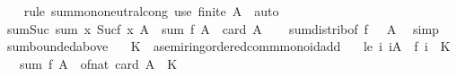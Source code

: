 \begin{isabellebody}
\ \ %
\endisadelimproof
%
\isatagproof
{}\isamarkupfalse%
\ {\isacharparenleft}{\kern0pt}rule\ sum{\isachardot}{\kern0pt}mono{\isacharunderscore}{\kern0pt}neutral{\isacharunderscore}{\kern0pt}cong{\isacharparenright}{\kern0pt}\ {\isacharparenleft}{\kern0pt}use\ {\isacartoucheopen}finite\ A{\isacartoucheclose}\ \ auto{\isacharparenright}{\kern0pt}%
\endisatagproof
{\isafoldproof}%
%
\isadelimproof
\isanewline
%
\endisadelimproof
\isanewline
{}\isamarkupfalse%
\isanewline
\isanewline
{}\isamarkupfalse%
\isanewline
\isanewline
{}\isamarkupfalse%
\ sum{\isacharunderscore}{\kern0pt}Suc{\isacharcolon}{\kern0pt}\ {\isachardoublequoteopen}sum\ {\isacharparenleft}{\kern0pt}{\isasymlambda}x{\isachardot}{\kern0pt}\ Suc{\isacharparenleft}{\kern0pt}f\ x{\isacharparenright}{\kern0pt}{\isacharparenright}{\kern0pt}\ A\ {\isacharequal}{\kern0pt}\ sum\ f\ A\ {\isacharplus}{\kern0pt}\ card\ A{\isachardoublequoteclose}\isanewline
%
\isadelimproof
\ \ %
\endisadelimproof
%
\isatagproof
{}\isamarkupfalse%
\ sum{\isachardot}{\kern0pt}distrib{\isacharbrackleft}{\kern0pt}of\ f\ {\isachardoublequoteopen}{\isasymlambda}{\isacharunderscore}{\kern0pt}{\isachardot}{\kern0pt}\ {}{\isachardoublequoteclose}\ A{\isacharbrackright}{\kern0pt}\ \isamarkupfalse%
\ simp%
\endisatagproof
{\isafoldproof}%
%
\isadelimproof
\isanewline
%
\endisadelimproof
\isanewline
{}\isamarkupfalse%
\ sum{\isacharunderscore}{\kern0pt}bounded{\isacharunderscore}{\kern0pt}above{\isacharcolon}{\kern0pt}\isanewline
\ \ \ K\ {\isacharcolon}{\kern0pt}{\isacharcolon}{\kern0pt}\ {\isachardoublequoteopen}{\isacharprime}{\kern0pt}a{\isacharcolon}{\kern0pt}{\isacharcolon}{\kern0pt}{\isacharbraceleft}{\kern0pt}semiring{\isacharunderscore}{\kern0pt}{}{\isacharcomma}{\kern0pt}ordered{\isacharunderscore}{\kern0pt}comm{\isacharunderscore}{\kern0pt}monoid{\isacharunderscore}{\kern0pt}add{\isacharbraceright}{\kern0pt}{\isachardoublequoteclose}\isanewline
\ \ \ le{\isacharcolon}{\kern0pt}\ {\isachardoublequoteopen}{\isasymAnd}i{\isachardot}{\kern0pt}\ i{\isasymin}A\ {\isasymLongrightarrow}\ f\ i\ {\isasymle}\ K{\isachardoublequoteclose}\isanewline
\ \ \ {\isachardoublequoteopen}sum\ f\ A\ {\isasymle}\ of{\isacharunderscore}{\kern0pt}nat\ {\isacharparenleft}{\kern0pt}card\ A{\isacharparenright}{\kern0pt}\ {\isacharasterisk}{\kern0pt}\ K{\isachardoublequoteclose}\isanewline
%
\isadelimproof
%
\endisadelimproof
%
\isatagproof
{}\isamarkupfalse%

\end{isabellebody}
